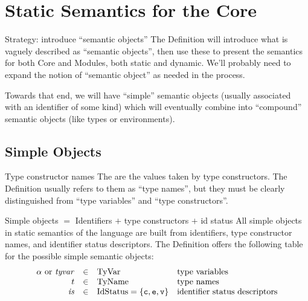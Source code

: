 \chapter{Static Semantics for the Core}

\begin{remark}{Strategy: introduce ``semantic objects''}
The Definition will introduce what is vaguely described as ``semantic
objects'', then use these to present the semantics for both Core and
Modules, both static and dynamic. We'll probably need to expand the
notion of ``semantic object'' as needed in the process.

Towards that end, we will have ``simple'' semantic objects (usually
associated with an identifier of some kind) which will
eventually combine into ``compound'' semantic objects (like types or
environments). 
\end{remark}

\section{Simple Objects}\label{sec:static-core:simple-objects}

\begin{definition}{Type constructor names}
The  are the values taken by type
constructors. The Definition usually refers to them as ``type names'',
but they must be clearly distinguished from ``type variables'' and
``type constructors''.
\end{definition}

\begin{clause}{Simple objects $=$ Identifiers $+$ type constructors $+$ id status}
All simple objects in static semantics of the language are built from
identifiers, type constructor names, and identifier status
descriptors. The Definition offers the following table for the possible
simple semantic objects:
\begin{equation*}
\begin{array}{rcll}
\alpha\ {\rm or}\ \textit{tyvar\/} & \in   & {\rm TyVar}       & \mbox{type variables}\\
t                & \in   & {\rm TyName}     & \mbox{type names}\\
\textit{is\/}              & \in   & \hbox{\rm IdStatus} = \{\hbox{\tt c},\hbox{\tt e},\hbox{\tt v}\}    & \mbox{identifier status descriptors}
\end{array}
\end{equation*}
\end{clause}

